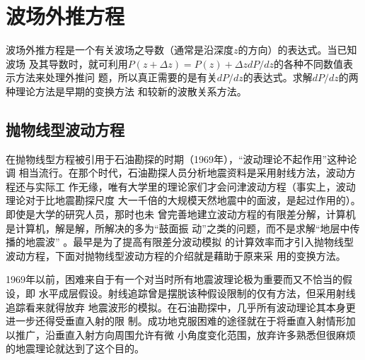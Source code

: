 \section{波场外推方程}
\label{sec:2.1}

波场外推方程是一个有关波场之导数（通常是沿深度$z$的方向）的表达式。当已知波场
及其导数时，就可利用$P(z+\Delta z)=P(z)+\Delta zdP/dz$的各种不同数值表示方法来处理外推问
题，所以真正需要的是有关$dP/dz$的表达式。求解$dP/dz$的两种理论方法是早期的变换方法
和较新的波散关系方法。

\subsection{抛物线型波动方程}
\label{sec:2.1.1}

在抛物线型方程被引用于石油勘探的时期（1969年），“波动理论不起作用”这种论调
相当流行。在那个时代，石油勘探人员分析地震资料是采用射线方法，波动方程还与实际工
作无缘，唯有大学里的理论家们才会问津波动方程（事实上，波动理论对于比地震勘探尺度
大一千倍的大规模天然地震中的面波，是起过作用的）。即使是大学的研究人员，那时也未
曾完善地建立波动方程的有限差分解，计算机是计算机，解是解，所解决的多为“鼓面振
动”之类的问题，而不是求解“地层中传播的地震波”
。最早是为了提高有限差分波动模拟
的计算效率而才引入抛物线型波动方程，下面对抛物线型波动方程的介绍就是藉助于原来采
用的变换方法。

1969年以前，困难来自于有一个对当时所有地震波理论极为重要而又不恰当的假设，即
水平成层假设。射线追踪曾是摆脱该种假设限制的仅有方法，但采用射线追踪看来就得放弃
地震波形的模拟。在石油勘探中，几乎所有波动理论其本身更进一步还得受垂直入射的限
制。成功地克服困难的途径就在于将垂直入射情形加以推广，沿垂直入射方向周围允许有微
小角度变化范围，放弃许多熟悉但很麻烦的地震理论就达到了这个目的。


